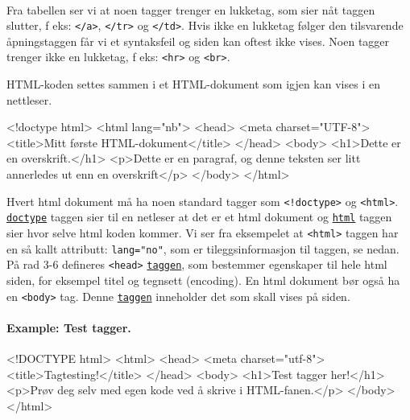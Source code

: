 \documentclass[%
oneside,                 %
final,                   %
10pt]{article}
\newenvironment{notice_mdfboxadmon}[1][]{
\begin{notice_mdfboxmdframed}[frametitle=#1]
}
{
\end{notice_mdfboxmdframed}
}
\newenvironment{block_mdfboxadmon}[1][]{
\begin{block_mdfboxmdframed}[frametitle=#1]
}
{
\end{block_mdfboxmdframed}
}
\begin{document}
\\


Fra tabellen ser vi at noen tagger trenger en lukketag, som sier nåt
taggen slutter, f eks: \texttt{</a>}, \texttt{</tr>} og \texttt{</td>}. Hvis ikke en
lukketag følger den tilsvarende åpningstaggen får vi et syntaksfeil og
siden kan oftest ikke vises. Noen tagger trenger ikke en lukketag, f
eks: \texttt{<hr>} og \texttt{<br>}.

HTML-koden settes sammen i et HTML-dokument som igjen kan vises i en
nettleser.


\begin{block_mdfboxadmon}[]
\bhtml
<!doctype html>
<html lang="nb">
<head>
	<meta charset="UTF-8">
	<title>Mitt første HTML-dokument</title>
</head>
<body>
	<h1>Dette er en overskrift.</h1> 
	<p>Dette er en paragraf, og denne teksten ser litt annerledes 
          ut enn en overskrift</p>
</body>
</html>
\ehtml
\end{block_mdfboxadmon}



Hvert html dokument må ha noen standard tagger som \Verb?<!doctype>? og
\texttt{<html>}. \href{{http://www.w3schools.com/tags/tag_doctype.asp}}{\nolinkurl{doctype}}
taggen sier til en netleser at det er et html dokument og
\href{{http://www.w3schools.com/tags/tag_html.asp}}{\nolinkurl{html}} taggen sier hvor
selve html koden kommer. Vi ser fra eksempelet at \texttt{<html>} taggen har
en så kallt attributt: \texttt{lang="no"}, som er tileggsinformasjon til
taggen, se nedan. På rad 3-6 defineres \texttt{<head>}
\href{{http://www.w3schools.com/tags/tag_head.asp}}{\nolinkurl{taggen}}, som bestemmer
egenskaper til hele html siden, for eksempel titel og tegnsett
(encoding). En html dokument bør også ha en \texttt{<body>} tag. Denne
\href{{http://www.w3schools.com/tags/tag_body.asp}}{\nolinkurl{taggen}} inneholder det
som skall vises på siden.

\paragraph{Example: Test tagger.}
\label{example:testtagger}


\begin{notice_mdfboxadmon}
\bhtml
<!DOCTYPE html>
<html>
<head>
    <meta charset="utf-8">
    <title>Tagtesting!</title>
</head>
<body>
    <h1>Test tagger her!</h1>
    <p>Prøv deg selv med egen kode ved å skrive i HTML-fanen.</p>
</body>
</html>
\ehtml
\end{notice_mdfboxadmon}
\end{document}
